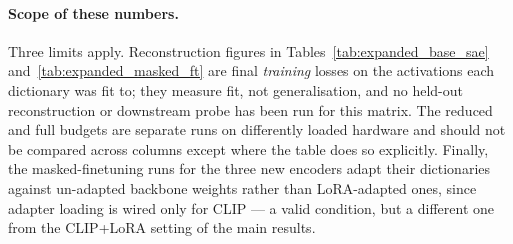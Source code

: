 \paragraph{Scope of these numbers.}
Three limits apply. Reconstruction figures in
Tables~\ref{tab:expanded_base_sae} and~\ref{tab:expanded_masked_ft} are final
\emph{training} losses on the activations each dictionary was fit to; they measure fit,
not generalisation, and no held-out reconstruction or downstream probe has been run for
this matrix. The reduced and full budgets are separate runs on differently loaded
hardware and should not be compared across columns except where the table does so
explicitly. Finally, the masked-finetuning runs for the three new encoders adapt their
dictionaries against un-adapted backbone weights rather than LoRA-adapted ones, since
adapter loading is wired only for CLIP --- a valid condition, but a different one from
the CLIP+LoRA setting of the main results.






